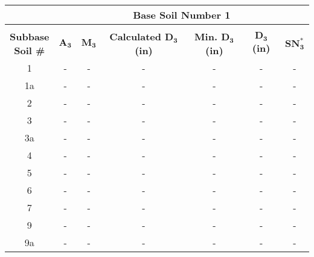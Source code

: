 \documentclass{article}
\begin{document}
\begin{center}
\begin{spacing}{1.6}

        \begin{tabular}{|c|cccccc|}
            \hline    
            \multicolumn{1}{|l}{}                     & \multicolumn{6}{c|}{\textbf{Base Soil Number 1}}                                              \\\hline
            &&&&&&\\
             \shortstack[c]{\textbf{Subbase}\\\textbf{Soil \#}} & $\bm{A_3}$ & $\bm{M_3}$  & \textbf{Calculated $\bm{D_3}$ (in)} & \textbf{Min. $\bm{D_3}$ (in)} & \textbf{$\bm{D_3}$ (in)} & $\bm{SN_3^*}$  \\\hline
                                            1       & -     & -    & -    & -                    & -              & -               \\
                                            1a      & -     & -    & -    & -                    & -              & -               \\
                                            2       & -     & -    & -    & -                    & -              & -               \\
                                            3       & -     & -    & -    & -                    & -              & -               \\
                                            3a      & -     & -    & -    & -                    & -              & -               \\
                                            4       & -     & -    & -    & -                    & -              & -               \\
                                            5       & -     & -    & -    & -                    & -              & -               \\
                                            6       & -     & -    & -    & -                    & -              & -               \\
                                            7       & -     & -    & -    & -                    & -              & -               \\
                                            9       & -     & -    & -    & -                    & -              & -               \\
                                            9a      & -     & -    & -    & -                    & -              & -               \\

\end{tabular}
\end{spacing}
\end{center}
\end{document}
